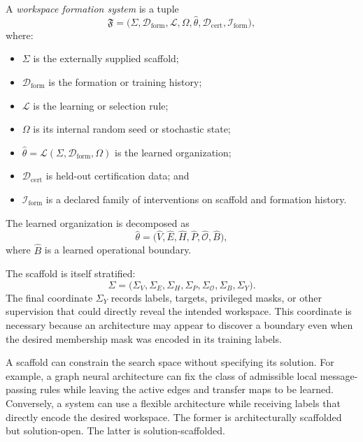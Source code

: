 \begin{SRWTdefinition}\label{SRWT:def:formation-system}
A \emph{workspace formation system} is a tuple
\[
\mathfrak F
=
\bigl(
\Sigma,
\mathcal D_{\mathrm{form}},
\mathcal L,
\Omega,
\widehat\theta,
\mathcal D_{\mathrm{cert}},
\mathcal I_{\mathrm{form}}
\bigr),
\]
where:
\begin{itemize}
\item \(\Sigma\) is the externally supplied scaffold;
\item \(\mathcal D_{\mathrm{form}}\) is the formation or training history;
\item \(\mathcal L\) is the learning or selection rule;
\item \(\Omega\) is its internal random seed or stochastic state;
\item \(\widehat\theta=\mathcal L(\Sigma,\mathcal D_{\mathrm{form}},\Omega)\)
 is the learned organization;
\item \(\mathcal D_{\mathrm{cert}}\) is held-out certification data; and
\item \(\mathcal I_{\mathrm{form}}\) is a declared family of interventions on
 scaffold and formation history.
\end{itemize}
The learned organization is decomposed as
\[
\widehat\theta
=
\bigl(
\widehat V,
\widehat E,
\widehat H,
\widehat P,
\widehat{\mathcal O},
\widehat B
\bigr),
\]
where \(\widehat B\) is a learned operational boundary.
\end{SRWTdefinition}

The scaffold is itself stratified:
\[
\boxed{
\Sigma
=
\bigl(
\Sigma_V,
\Sigma_E,
\Sigma_H,
\Sigma_P,
\Sigma_{\mathcal O},
\Sigma_B,
\Sigma_Y
\bigr).
}
\]
The final coordinate \(\Sigma_Y\) records labels, targets, privileged masks,
or other supervision that could directly reveal the intended workspace. This
coordinate is necessary because an architecture may appear to discover a
boundary even when the desired membership mask was encoded in its training
labels.


A scaffold can constrain the search space without specifying its solution.
For example, a graph neural architecture can fix the class of admissible local
message-passing rules while leaving the active edges and transfer maps to be
learned. Conversely, a system can use a flexible architecture while receiving
labels that directly encode the desired workspace. The former is
architecturally scaffolded but solution-open. The latter is solution-scaffolded.

